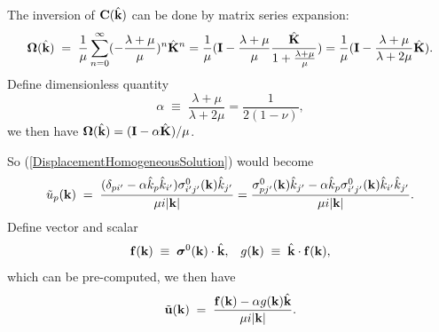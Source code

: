 \documentclass[12pt]{article}
\def\bmath#1{\mbox{\boldmath$#1$}}
\begin{document}
The inversion of ${\bf C}(\hat{\bf k})$ can be done by matrix series expansion:
\begin{equation}
 {\bf \Omega}(\hat{\bf k}) \;=\; 
\frac{1}{\mu}\sum_{n=0}^\infty (-\frac{\lambda+\mu}{\mu})^n \hat{\bf K}^n 
= \frac{1}{\mu} ( {\bf I} - \frac{\lambda+\mu}{\mu} \frac{\hat{\bf K}}{1+\frac{\lambda+\mu}{\mu}} ) 
= \frac{1}{\mu} ( {\bf I} - \frac{\lambda+\mu}{\lambda+2\mu}\hat{\bf K} ).
\end{equation}
Define dimensionless quantity
\begin{equation}
 \alpha \;\equiv\; \frac{\lambda+\mu}{\lambda+2\mu} = \frac{1}{2(1-\nu)},
\end{equation}
we then have ${\bf \Omega}(\hat{\bf k}) = ({\bf I} - \alpha\hat{\bf K})/\mu$.

So (\ref{DisplacementHomogeneousSolution}) would become
\begin{equation}
 \tilde{u}_p({\bf k}) \;=\; 
 \frac{(\delta_{pi'}-\alpha\hat{k}_p\hat{k}_{i'})\sigma^0_{i'j'}({\bf k}) \hat{k}_{j'}}
 {\mu i|{\bf k}|} = \frac{\sigma^0_{pj'}({\bf k}) \hat{k}_{j'} - 
 \alpha\hat{k}_p\sigma^0_{i'j'}({\bf k})\hat{k}_{i'}\hat{k}_{j'}}
 {\mu i|{\bf k}|}.
\end{equation}
Define vector and scalar 
\begin{equation}
 {\bf f}({\bf k}) \;\equiv\; \bmath{\sigma}^0({\bf k})\cdot \hat{\bf k}, \;\;\;
 g({\bf k}) \;\equiv\; \hat{\bf k}\cdot {\bf f}({\bf k}),
\end{equation}
which can be pre-computed, we then have
\begin{equation}
 \tilde{\bf u}({\bf k}) \;=\; 
 \frac{{\bf f}({\bf k}) - \alpha g({\bf k})\hat{\bf k}}{\mu i|{\bf k}|}.
 \label{DisplacementHomogeneousIsotropicSolution}
\end{equation}
\end{document}
